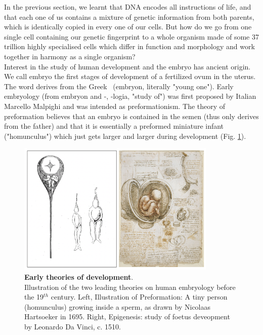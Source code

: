 In the previous section, we learnt that DNA encodes all instructions of life, and that each one of us contains a mixture of genetic information from both parents, which is identically copied in every one of our cells.
But how do we go from one single cell containing our genetic fingerprint to a whole organism made of some 37 trillion highly specialised cells which differ in function and morphology and work together in harmony as a single organism?\\

Interest in the study of human development and the embryo has ancient origin.
We call embryo the first stages of development of a fertilized ovum in the uterus.
The word derives from 
the Greek \textepsilon\textmu\textbeta\textrho\textupsilon\textomikron\textnu \ (embryon, literally "young one").
Early embryology (from embryon and -\textlambda\textomikron\textgamma\textiota\textalpha, -logia, "study of") was first proposed by Italian Marcello Malpighi and was intended as preformationism.
The theory of preformation believes that an embryo is contained in the semen (thus only derives from the father) and that it is essentially a preformed miniature infant ("homunculus") which just gets larger and larger during development (Fig. \ref{fig:early_embryology}).\\

\begin{figure}
\includegraphics[width=9.5cm]{Chapter1/Fig/Early_theories_development.png}
\caption[Early theories of development]{\textbf{Early theories of development}.\\
Illustration of the two leading theories on human embryology before the 19$^{th}$ century.
Left, Illustration of Preformation: 
A tiny person (homunculus) growing inside a sperm, as drawn by Nicolaas Hartsoeker in 1695.
Right, Epigenesis: study of foetus deveopment by Leonardo Da Vinci, c. 1510.}
\label{fig:early_embryology}
\end{figure}

